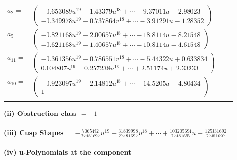 \documentclass[1p]{elsarticle_modified}
\theoremstyle{definition}
\begin{document}
\begin{tabular}{m{7pt} m{180pt} m{7pt} m{180pt} }
\flushright $a_{2}=$&$\begin{pmatrix}-0.653089 u^{19}-1.43379 u^{18}+\cdots-9.37011 u-2.98023\\-0.349978 u^{19}-0.737864 u^{18}+\cdots-3.91291 u-1.28352\end{pmatrix}$ \\
\flushright $a_{5}=$&$\begin{pmatrix}-0.821168 u^{19}-2.00657 u^{18}+\cdots-18.8114 u-8.21548\\-0.621168 u^{19}-1.40657 u^{18}+\cdots-10.8114 u-4.61548\end{pmatrix}$ \\
\flushright $a_{11}=$&$\begin{pmatrix}-0.361356 u^{19}-0.786551 u^{18}+\cdots-5.44322 u+0.633834\\0.104807 u^{19}+0.257238 u^{18}+\cdots+2.51174 u+2.33233\end{pmatrix}$ \\
\flushright $a_{10}=$&$\begin{pmatrix}-0.923097 u^{19}-2.14812 u^{18}+\cdots-14.5205 u-4.80434\\1\end{pmatrix}$\\&\end{tabular}
\flushleft \textbf{(ii) Obstruction class $= -1$}\\~\\
\flushleft \textbf{(iii) Cusp Shapes $= -\frac{7065492}{27481697} u^{19}-\frac{31839998}{27481697} u^{18}+\cdots+\frac{103205694}{27481697} u-\frac{125331692}{27481697}$}\\~\\
\newpage\renewcommand{\arraystretch}{1}
\flushleft \textbf{(iv) u-Polynomials at the component}\newline \\
\end{document}
